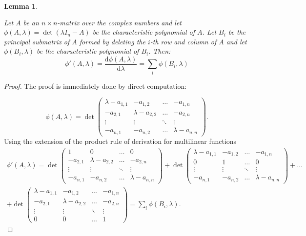 \documentclass[a4paper,11pt]{report}
\newtheorem{lemma}[theorem]{Lemma}
\begin{document}
 \begin{lemma}\label{maclane}

   Let $A$ be an $n \times n$-matrix over the complex numbers and let $\phi(A, \lambda) = \det(\lambda I_n - A)$
   be the characteristic polynomial of $A$. Let $B_i$ be the principal submatrix 
   of $A$ formed by deleting the $i$-th row and column of $A$ and let $\phi(B_i, \lambda)$ 
   be the characteristic polynomial of $B_i$. Then:
   $$\phi'(A, \lambda) = \frac{\mathrm{d}\phi(A, \lambda)}{\mathrm{d}\lambda}= 
   \sum_i \phi(B_i, \lambda)$$
 \end{lemma}
\begin{proof}
  The proof is immediately done by direct computation:
  
  $$\phi(A, \lambda) = \det\begin{pmatrix} 
\lambda -a_{1,1} & -a_{1,2}  & \ldots & -a_{1,n}   \\
-a_{2,1}  & \lambda - a_{2,2} & \ldots & -a_{2,n}   \\
\vdots & \vdots & \ddots & \vdots  \\
- a_{n,1}  & -a_{n,2} & \ldots & \lambda - a_{n,n}  
\end{pmatrix}.$$
Using the extension of the product rule of derivation for multilinear functions
\begin{eqnarray*}
  \phi'(A, \lambda) = \det\begin{pmatrix} 
1 & 0  & \ldots & 0    \\
-a_{2,1}  & \lambda - a_{2,2} & \ldots & -a_{2,n}   \\
\vdots & \vdots & \ddots & \vdots  \\
- a_{n,1}  & -a_{n,2} & \ldots & \lambda - a_{n,n}  
\end{pmatrix} + 
\det\begin{pmatrix} 
\lambda -a_{1,1} & -a_{1,2}  & \ldots & -a_{1,n}   \\
0  & 1 & \ldots &  0   \\
\vdots & \vdots & \ddots & \vdots  \\
- a_{n,1}  & -a_{n,2} & \ldots & \lambda - a_{n,n}  
\end{pmatrix} + \ldots \\
+ \det\begin{pmatrix} 
\lambda -a_{1,1} & -a_{1,2}  & \ldots & -a_{1,n}   \\
-a_{2,1}  & \lambda - a_{2,2} & \ldots & -a_{2,n}   \\
\vdots & \vdots & \ddots & \vdots  \\
0  & 0 & \ldots & 1
\end{pmatrix} = \sum_i \phi(B_i, \lambda).
\end{eqnarray*}
\end{proof}
\end{document}
